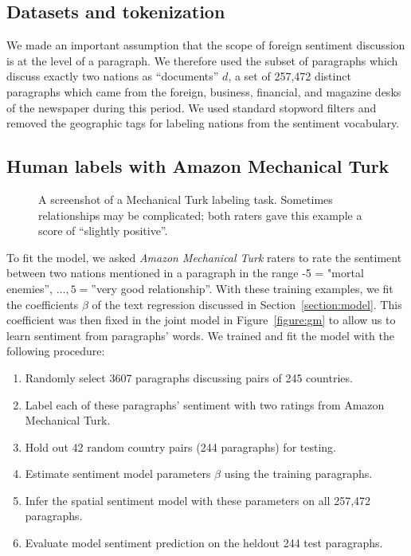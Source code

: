 \subsection{Datasets and tokenization}  We made an important
assumption that the scope of foreign sentiment discussion is at the
level of a paragraph.  We therefore used the subset of paragraphs
which discuss exactly two nations as ``documents'' $d$, a set of
257,472 distinct paragraphs which came from the foreign, business,
financial, and magazine desks of the newspaper during this period. We
used standard stopword filters and removed the geographic tags for
labeling nations from the sentiment vocabulary.

\subsection{Human labels with Amazon Mechanical Turk}
\label{section:mturk}
\begin{figure}
  \setlength\fboxsep{0pt}
  \setlength\fboxrule{0.5pt}
  \center {}
  \label{figure:mechanical_turk_sample}
  \small\caption{A screenshot of a Mechanical Turk labeling task.
    Sometimes relationships may be complicated; both raters gave this
    example a score of ``slightly positive''.}
  \normalsize
\end{figure}

To fit the model, we asked \emph{Amazon Mechanical Turk} raters to rate the
sentiment between two nations mentioned in a paragraph in the range -5
= "mortal enemies'', $\ldots, 5 = $''very good relationship''.
With these training examples, we fit the coefficients $\beta$ of the
text regression discussed in Section~\ref{section:model}.  This
coefficient was then fixed in the joint model in
Figure~\ref{figure:gm} to allow us to learn sentiment from
paragraphs' words.  We trained and fit the model with the following procedure:

\begin{enumerate}
  \item Randomly select 3607 paragraphs discussing pairs of 245 countries.
  \item Label each of these paragraphs' sentiment with two ratings
    from Amazon Mechanical Turk.
  \item Hold out 42 random country pairs (244 paragraphs) for testing.
  \item Estimate sentiment model parameters $\beta$ using the training
    paragraphs.
  \item Infer the spatial sentiment model with these parameters on
    all 257,472 paragraphs.
  \item Evaluate model sentiment prediction on the heldout 244 test
    paragraphs.
\end{enumerate}
  
